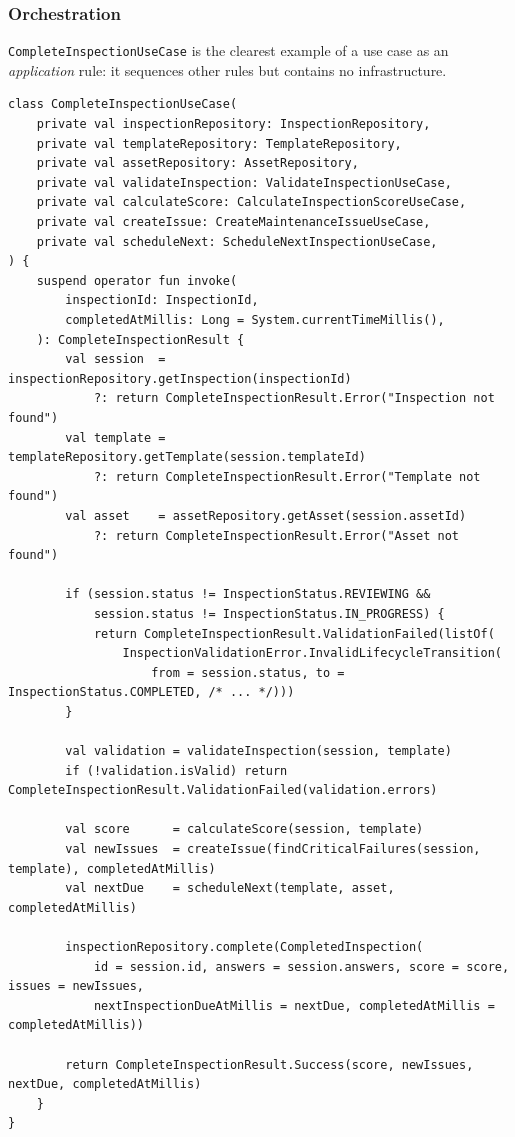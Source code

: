 \documentclass[11pt,a4paper]{article}
\newcommand{\file}[1]{{\small\texttt{#1}}}
\begin{document}
\subsubsection{Orchestration}

\file{CompleteInspectionUseCase} is the clearest example of a use case as an
\emph{application} rule: it sequences other rules but contains no infrastructure.

\begin{lstlisting}[caption={\file{domain/.../usecase/CompleteInspectionUseCase.kt}
(abridged) --- all seven collaborators are domain types; none is a Room type.}]
class CompleteInspectionUseCase(
    private val inspectionRepository: InspectionRepository,
    private val templateRepository: TemplateRepository,
    private val assetRepository: AssetRepository,
    private val validateInspection: ValidateInspectionUseCase,
    private val calculateScore: CalculateInspectionScoreUseCase,
    private val createIssue: CreateMaintenanceIssueUseCase,
    private val scheduleNext: ScheduleNextInspectionUseCase,
) {
    suspend operator fun invoke(
        inspectionId: InspectionId,
        completedAtMillis: Long = System.currentTimeMillis(),
    ): CompleteInspectionResult {
        val session  = inspectionRepository.getInspection(inspectionId)
            ?: return CompleteInspectionResult.Error("Inspection not found")
        val template = templateRepository.getTemplate(session.templateId)
            ?: return CompleteInspectionResult.Error("Template not found")
        val asset    = assetRepository.getAsset(session.assetId)
            ?: return CompleteInspectionResult.Error("Asset not found")

        if (session.status != InspectionStatus.REVIEWING &&
            session.status != InspectionStatus.IN_PROGRESS) {
            return CompleteInspectionResult.ValidationFailed(listOf(
                InspectionValidationError.InvalidLifecycleTransition(
                    from = session.status, to = InspectionStatus.COMPLETED, /* ... */)))
        }

        val validation = validateInspection(session, template)
        if (!validation.isValid) return CompleteInspectionResult.ValidationFailed(validation.errors)

        val score      = calculateScore(session, template)
        val newIssues  = createIssue(findCriticalFailures(session, template), completedAtMillis)
        val nextDue    = scheduleNext(template, asset, completedAtMillis)

        inspectionRepository.complete(CompletedInspection(
            id = session.id, answers = session.answers, score = score, issues = newIssues,
            nextInspectionDueAtMillis = nextDue, completedAtMillis = completedAtMillis))

        return CompleteInspectionResult.Success(score, newIssues, nextDue, completedAtMillis)
    }
}
\end{lstlisting}
\end{document}
